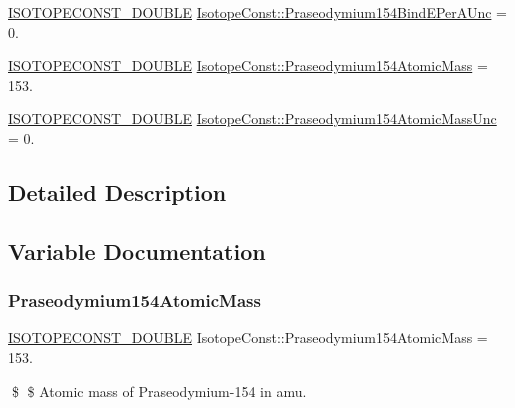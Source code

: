 \begin{DoxyCompactItemize}
\item 
\mbox{\hyperlink{group___isotope_const-_macros_ga8f45a7272ce02c0b4c65c44636ed719a}{I\+S\+O\+T\+O\+P\+E\+C\+O\+N\+S\+T\+\_\+\+D\+O\+U\+B\+LE}} \mbox{\hyperlink{group___isotope_const-_praseodymium-_pr154_gae7e291dc5bd3253ef3bccea48a91dc56}{Isotope\+Const\+::\+Praseodymium154\+Bind\+E\+Per\+A\+Unc}} = 0.
\item 
\mbox{\hyperlink{group___isotope_const-_macros_ga8f45a7272ce02c0b4c65c44636ed719a}{I\+S\+O\+T\+O\+P\+E\+C\+O\+N\+S\+T\+\_\+\+D\+O\+U\+B\+LE}} \mbox{\hyperlink{group___isotope_const-_praseodymium-_pr154_gaf960e2d85ea1374a9c1eb41ac480f1de}{Isotope\+Const\+::\+Praseodymium154\+Atomic\+Mass}} = 153.
\item 
\mbox{\hyperlink{group___isotope_const-_macros_ga8f45a7272ce02c0b4c65c44636ed719a}{I\+S\+O\+T\+O\+P\+E\+C\+O\+N\+S\+T\+\_\+\+D\+O\+U\+B\+LE}} \mbox{\hyperlink{group___isotope_const-_praseodymium-_pr154_gab2e603ffe4bac7053b76421a58c9eed9}{Isotope\+Const\+::\+Praseodymium154\+Atomic\+Mass\+Unc}} = 0.
\end{DoxyCompactItemize}


\subsection{Detailed Description}


\subsection{Variable Documentation}
\mbox{\label{group___isotope_const-_praseodymium-_pr154_gaf960e2d85ea1374a9c1eb41ac480f1de}} 
\subsubsection{\texorpdfstring{Praseodymium154\+Atomic\+Mass}{Praseodymium154AtomicMass}}
{\footnotesize\ttfamily \mbox{\hyperlink{group___isotope_const-_macros_ga8f45a7272ce02c0b4c65c44636ed719a}{I\+S\+O\+T\+O\+P\+E\+C\+O\+N\+S\+T\+\_\+\+D\+O\+U\+B\+LE}} Isotope\+Const\+::\+Praseodymium154\+Atomic\+Mass = 153.}

\$ \$ Atomic mass of Praseodymium-\/154 in amu. \mbox{\label{group___isotope_const-_praseodymium-_pr154_gab2e603ffe4bac7053b76421a58c9eed9}} 
